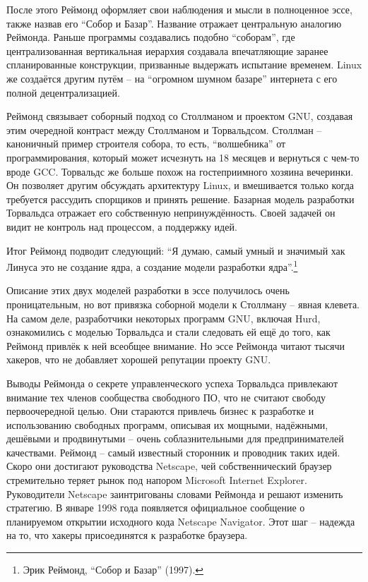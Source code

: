 После этого Реймонд оформляет свои наблюдения и мысли в полноценное эссе, также назвав его \enquote{Собор и Базар}. Название отражает центральную аналогию Реймонда. Раньше программы создавались подобно \enquote{соборам}, где централизованная вертикальная иерархия создавала впечатляющие заранее спланированные конструкции, призванные выдержать испытание временем. Linux же создаётся другим путём -- на \enquote{огромном шумном базаре} интернета с его полной децентрализацией.

Реймонд связывает соборный подход со Столлманом и проектом GNU, создавая этим очередной контраст между Столлманом и Торвальдсом. Столлман -- каноничный пример строителя собора, то есть, \enquote{волшебника} от программирования, который может исчезнуть на 18 месяцев и вернуться с чем-то вроде GCC. Торвальдс же больше похож на гостеприимного хозяина вечеринки. Он позволяет другим обсуждать архитектуру Linux, и вмешивается только когда требуется рассудить спорщиков и принять решение. Базарная модель разработки Торвальдса отражает его собственную непринуждённость. Своей задачей он видит не контроль над процессом, а поддержку идей.

Итог Реймонд подводит следующий: \enquote{Я думаю, самый умный и значимый хак Линуса это не создание ядра, а создание модели разработки ядра}.\footnote{Эрик Реймонд, \enquote{Собор и Базар} (1997).}

Описание этих двух моделей разработки в эссе получилось очень проницательным, но вот привязка соборной модели к Столлману -- явная клевета. На самом деле, разработчики некоторых программ GNU, включая Hurd, ознакомились с моделью Торвальдса и стали следовать ей ещё до того, как Реймонд привлёк к ней всеобщее внимание. Но эссе Реймонда читают тысячи хакеров, что не добавляет хорошей репутации проекту GNU.

Выводы Реймонда о секрете управленческого успеха Торвальдса привлекают внимание тех членов сообщества свободного ПО, что не считают свободу первоочередной целью. Они стараются привлечь бизнес к разработке и использованию свободных программ, описывая их мощными, надёжными, дешёвыми и продвинутыми -- очень соблазнительными для предпринимателей качествами. Реймонд -- самый известный сторонник и проводник таких идей. Скоро они достигают руководства Netscape, чей собственнический браузер стремительно теряет рынок под напором Microsoft Internet Explorer. Руководители Netscape заинтригованы словами Реймонда и решают изменить стратегию. В январе 1998 года появляется официальное сообщение о планируемом открытии исходного кода Netscape Navigator. Этот шаг -- надежда на то, что хакеры присоединятся к разработке браузера.

